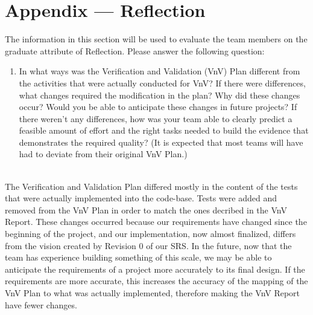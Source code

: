\documentclass[12pt, titlepage]{article}
\begin{document}
\newpage{}
\section*{Appendix --- Reflection}

The information in this section will be used to evaluate the team members on the
graduate attribute of Reflection.  Please answer the following question:

\begin{enumerate}
  \item In what ways was the Verification and Validation (VnV) Plan different
  from the activities that were actually conducted for VnV?  If there were
  differences, what changes required the modification in the plan?  Why did
  these changes occur?  Would you be able to anticipate these changes in future
  projects?  If there weren't any differences, how was your team able to clearly
  predict a feasible amount of effort and the right tasks needed to build the
  evidence that demonstrates the required quality?  (It is expected that most
  teams will have had to deviate from their original VnV Plan.)
\end{enumerate}
\\
The Verification and Validation Plan differed mostly in the content of the tests that were actually implemented into the code-base. Tests were added and removed from the VnV Plan in order to match the ones decribed in the VnV Report. These changes occurred because our requirements have changed since the beginning of the project, and our implementation, now almost finalized, differs from the vision created by Revision 0 of our SRS. In the future, now that the team has experience building something of this scale, we may be able to anticipate the requirements of a project more accurately to its final design. If the requirements are more accurate, this increases the accuracy of the mapping of the VnV Plan to what was actually implemented, therefore making the VnV Report have fewer changes.

\newpage{}
\end{document}
